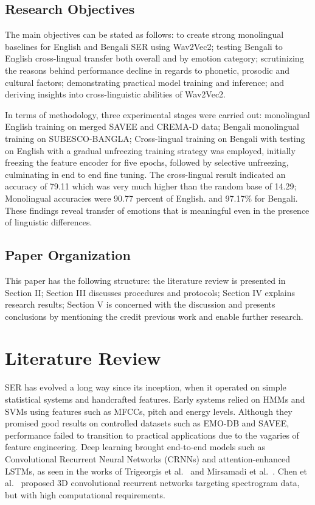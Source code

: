 \documentclass[conference]{IEEEtran}
\begin{document}
\subsection{Research Objectives}

The main objectives can be stated as follows: to create strong monolingual baselines for
English and Bengali SER using Wav2Vec2; testing Bengali to English cross-lingual transfer
both overall and by emotion category; scrutinizing the reasons behind performance decline in
regards to phonetic, prosodic and cultural factors; demonstrating practical model training and
inference; and deriving insights into cross-linguistic abilities of Wav2Vec2.

In terms of methodology, three experimental stages were carried out: monolingual English
training on merged SAVEE and CREMA-D data; Bengali monolingual training on SUBESCO-BANGLA; Cross-lingual training on Bengali with testing on English with a gradual unfreezing training strategy was employed, initially freezing the feature encoder for five epochs, followed by selective unfreezing,
culminating in end to end fine tuning.
The cross-lingual result indicated an accuracy of 79.11 which was very much higher than the random base of 14.29; Monolingual accuracies were 90.77 percent of English.
and 97.17\% for Bengali. These findings reveal transfer of emotions that is meaningful even in the presence of linguistic differences.

\subsection{Paper Organization}

This paper has the following structure: the literature review is presented in Section II; Section III discusses procedures and protocols; Section IV explains research results;
Section V is concerned with the discussion and presents conclusions by mentioning the credit previous work and enable further research.

\section{Literature Review}

SER has evolved a long way since its inception, when it operated on simple statistical systems
and handcrafted features. Early systems relied on HMMs and SVMs using features such as
MFCCs, pitch and energy levels. Although they promised good results on controlled datasets
such as EMO-DB and SAVEE, performance failed to transition to practical applications due to
the vagaries of feature engineering. Deep learning brought end-to-end models such as
Convolutional Recurrent Neural Networks (CRNNs) and attention-enhanced LSTMs, as seen
in the works of Trigeorgis et al.~\cite{trigeorgis2016} and Mirsamadi et al.~\cite{mirsamadi2017}.
Chen et al.~\cite{chen2018} proposed 3D convolutional recurrent networks targeting
spectrogram data, but with high computational requirements.
\end{document}
